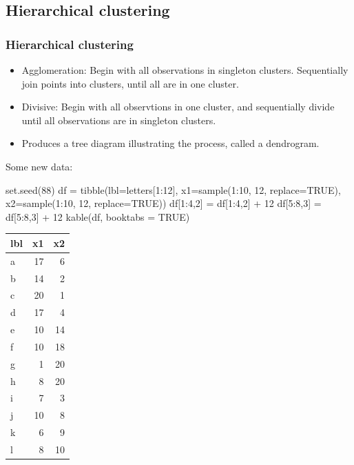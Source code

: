 \documentclass[a4paper]{article}\usepackage[]{graphicx}\usepackage[]{xcolor}
\begin{document}
\subsection{Hierarchical clustering}
\subsubsection{Hierarchical clustering}
\begin{itemize}
	\item \textcolor{myred}{Agglomeration}: Begin with all observations in singleton clusters. Sequentially \textcolor{myred}{join} points into clusters, until all are in one cluster. 
	\item \textcolor{myred}{Divisive}: Begin with all observtions in one cluster, and sequentially \textcolor{myred}{divide} until all observations are in singleton clusters. 
	\item Produces a tree diagram illustrating the process, called a dendrogram.
\end{itemize}
Some new data:\\
\begin{minipage}[t]{0.49\textwidth}
\centering
\begin{Schunk}
\begin{Sinput}
set.seed(88)
df = tibble(lbl=letters[1:12], 
             x1=sample(1:10, 12, replace=TRUE),
             x2=sample(1:10, 12, replace=TRUE))
df[1:4,2] = df[1:4,2] + 12
df[5:8,3] = df[5:8,3] + 12
kable(df, booktabs = TRUE)
\end{Sinput}

\begin{tabular}{lrr}
\toprule
lbl & x1 & x2\\
\midrule
a & 17 & 6\\
b & 14 & 2\\
c & 20 & 1\\
d & 17 & 4\\
e & 10 & 14\\
\addlinespace
f & 10 & 18\\
g & 1 & 20\\
h & 8 & 20\\
i & 7 & 3\\
j & 10 & 8\\
\addlinespace
k & 6 & 9\\
l & 8 & 10\\
\bottomrule
\end{tabular}

\end{Schunk}
\end{minipage}
\end{document}
